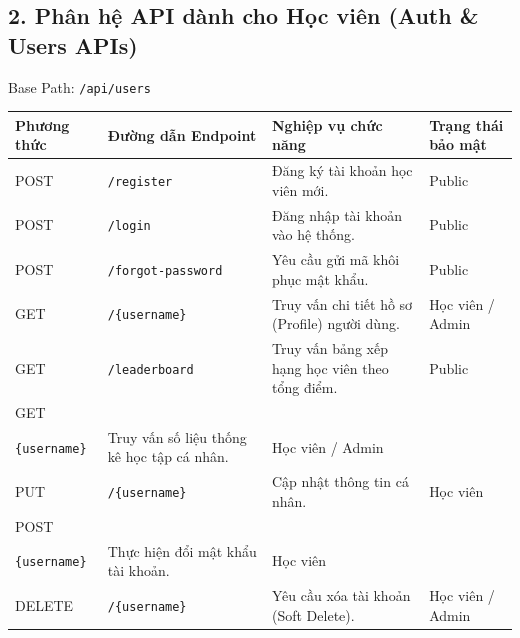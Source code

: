 \documentclass[12pt,a4paper]{article}
\makeatletter
\renewcommand{\_}{\BreakableUnderscore}
\newcommand{\tablecelllines}[1]{\begin{tabular}[t]{@{}l@{}}#1\end{tabular}}
\makeatother
\begin{document}
\subsection{2. Phân hệ API dành cho Học viên (Auth \& Users APIs)}

Base Path: \texttt{/api/users}

\begin{longtable}[]{
  |>{\raggedright\arraybackslash}p{}
  |>{\raggedright\arraybackslash}p{}
  |>{\raggedright\arraybackslash}p{}
  |>{\raggedright\arraybackslash}p{}|}
\hline\rowcolor{tableHeader}
\begin{minipage}[b]{\linewidth}\raggedright
Phương thức
\end{minipage} & \begin{minipage}[b]{\linewidth}\raggedright
Đường dẫn Endpoint
\end{minipage} & \begin{minipage}[b]{\linewidth}\raggedright
Nghiệp vụ chức năng
\end{minipage} & \begin{minipage}[b]{\linewidth}\raggedright
Trạng thái bảo mật
\end{minipage} \\
\hline
\endhead
\hline
\endlastfoot
POST & \texttt{/register} & Đăng ký tài khoản học viên mới. & Public \\
\hline
POST & \texttt{/login} & Đăng nhập tài khoản vào hệ thống. & Public \\
\hline
POST & \texttt{/forgot-password} & Yêu cầu gửi mã khôi phục mật khẩu. & Public \\
\hline
GET & \texttt{/\{username\}} & Truy vấn chi tiết hồ sơ (Profile) người dùng. & Học viên / Admin \\
\hline
GET & \texttt{/leaderboard} & Truy vấn bảng xếp hạng học viên theo tổng điểm. & Public \\
\hline
GET & \tablecelllines{\texttt{/statistics/}\\\texttt{\{username\}}} & Truy vấn số liệu thống kê học tập cá nhân. & Học viên / Admin \\
\hline
PUT & \texttt{/\{username\}} & Cập nhật thông tin cá nhân. & Học viên \\
\hline
POST & \tablecelllines{\texttt{/change-password/}\\\texttt{\{username\}}} & Thực hiện đổi mật khẩu tài khoản. & Học viên \\
\hline
DELETE & \texttt{/\{username\}} & Yêu cầu xóa tài khoản (Soft Delete). & Học viên / Admin \\
\hline
\end{longtable}
\end{document}
